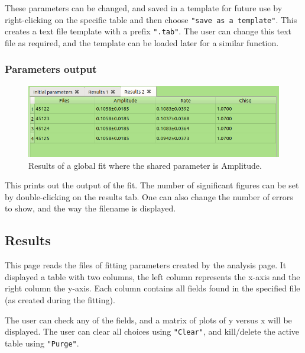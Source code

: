 \documentclass[10pt,letterpaper,oneside]{article}
\begin{document}
These parameters can be changed, and saved in a template for future use  by right-clicking on the specific table and then choose \verb+"save as a template"+. This creates a text file template with a prefix \verb+".tab"+. The  user can change this text file as required, and the template can be loaded later for a similar function.
\subsubsection{Parameters output}
\begin{figure}[h]
\center
\includegraphics[width=.75\textwidth]{analyze-res-g.png}
 \caption{Results of a global fit where the shared parameter is Amplitude. }
 \label{fig-tables}
 \end{figure}
This prints out the output of the fit. The number of significant figures can be set by double-clicking on the results tab. One can also change the number of errors to show, and the way the filename is displayed.


\clearpage
\subsection{Results}
This page reads the files of fitting parameters created by the
analysis page. It displayed a table with two columns, the left column represents the x-axis and the right column the y-axis.
Each column contains all fields found in the specified file (as created during the fitting). 

The user can check any of the fields, and a matrix of plots of y versus x will be displayed.  The user can clear all choices using \verb+"Clear"+, and kill/delete the active table using \verb+"Purge"+. 
\end{document}
